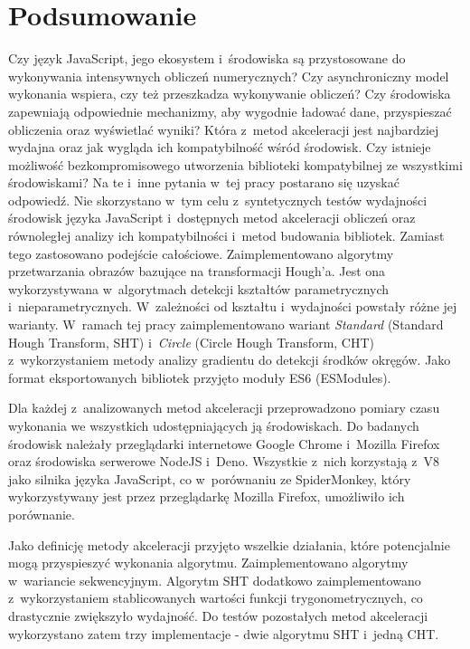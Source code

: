 \chapter{Podsumowanie}

Czy język JavaScript, jego ekosystem i~środowiska są przystosowane do wykonywania intensywnych obliczeń numerycznych? Czy asynchroniczny model wykonania wspiera, czy też przeszkadza wykonywanie obliczeń? Czy środowiska zapewniają odpowiednie mechanizmy, aby wygodnie ładować dane, przyspieszać obliczenia oraz wyświetlać wyniki? Która z~metod akceleracji jest najbardziej wydajna oraz jak wygląda ich kompatybilność wśród środowisk. Czy istnieje możliwość bezkompromisowego utworzenia biblioteki kompatybilnej ze wszystkimi środowiskami? Na te i~inne pytania w~tej pracy postarano się uzyskać odpowiedź. Nie skorzystano w~tym celu z~syntetycznych testów wydajności środowisk języka JavaScript i~dostępnych metod akceleracji obliczeń oraz równoległej analizy ich kompatybilności i~metod budowania bibliotek. Zamiast tego zastosowano podejście całościowe. Zaimplementowano algorytmy przetwarzania obrazów bazujące na transformacji Hough'a. Jest ona wykorzystywana w~algorytmach detekcji kształtów parametrycznych i~nieparametrycznych. W~zależności od kształtu i~wydajności powstały różne jej warianty. W~ramach tej pracy zaimplementowano wariant \textit{Standard} (Standard Hough Transform, SHT) i~\textit{Circle} (Circle Hough Transform, CHT) z~wykorzystaniem metody analizy gradientu do detekcji środków okręgów. Jako format eksportowanych bibliotek przyjęto moduły ES6 (ESModules).

Dla każdej z~analizowanych metod akceleracji przeprowadzono pomiary czasu wykonania we wszystkich udostępniających ją środowiskach. Do badanych środowisk należały przeglądarki internetowe Google Chrome i~Mozilla Firefox oraz środowiska serwerowe NodeJS i~Deno. Wszystkie z~nich korzystają z~V8 jako silnika języka JavaScript, co w~porównaniu ze SpiderMonkey, który wykorzystywany jest przez przeglądarkę Mozilla Firefox, umożliwiło ich porównanie. 

Jako definicję metody akceleracji przyjęto wszelkie działania, które potencjalnie mogą przyspieszyć wykonania algorytmu. Zaimplementowano algorytmy w~wariancie sekwencyjnym. Algorytm SHT dodatkowo zaimplementowano z~wykorzystaniem stablicowanych wartości funkcji trygonometrycznych, co drastycznie zwiększyło wydajność. Do testów pozostałych metod akceleracji wykorzystano zatem trzy implementacje - dwie algorytmu SHT i~jedną CHT.


